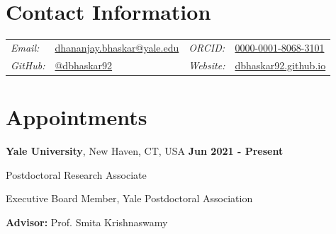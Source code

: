 \documentclass[margin,line]{res}
\newenvironment{list1}{
  \begin{list}{\ding{113}}{
      \setlength{\itemsep}{0in}
      \setlength{\parsep}{0in} \setlength{\parskip}{0in}
      \setlength{\topsep}{0in} \setlength{\partopsep}{0in}
      \setlength{\leftmargin}{0.17in}}}{\end{list}}
\begin{document}
\pagestyle{plain}


\begin{resume}

\vspace*{.2cm}

\section{\sc Contact Information}

\renewcommand{\arraystretch}{1.1}
\begin{tabular}{@{}p{1.8cm}p{6.3cm}p{2.1cm}p{4cm}}
{\it Email:} & \href{mailto:dhananjay.bhaskar@yale.edu}{dhananjay.bhaskar@yale.edu} & {\it ORCID:} & \href{https://orcid.org/0000-0001-8068-3101}{0000-0001-8068-3101} \\
{\it GitHub:} & \href{https://github.com/dbhaskar92}{@dbhaskar92} & {\it Website:} & \href{https://dbhaskar92.github.io/}{dbhaskar92.github.io}
\end{tabular}

\vspace*{.05cm}


\section{\sc Appointments}

{\bf Yale University}, New Haven, CT, USA  \hfill {\bf Jun 2021 - Present}\\
\vspace*{-.2cm}
\begin{list1}
\setlength\itemsep{0.22em}
\item[] Postdoctoral Research Associate
\item[] Executive Board Member, Yale Postdoctoral Association
\vspace*{.1cm}
\item[] {\bf Advisor:} Prof. Smita Krishnaswamy
\end{list1}


\end{resume}
\end{document}
